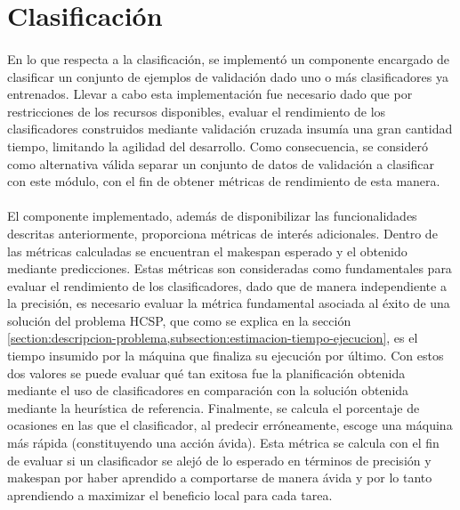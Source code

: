 \section{Clasificación} \label{chapter-implementacion:clasificacion}

\paragraph{} En lo que respecta a la clasificación, se implementó un componente encargado de clasificar un conjunto de ejemplos de validación dado uno o más clasificadores ya entrenados.
Llevar a cabo esta implementación fue necesario dado que por restricciones de los recursos disponibles, evaluar el rendimiento de los clasificadores construidos mediante validación cruzada insumía una gran cantidad tiempo, limitando la agilidad del desarrollo.
Como consecuencia, se consideró como alternativa válida separar un conjunto de datos de validación a clasificar con este módulo, con el fin de obtener métricas de rendimiento de esta manera. 

\paragraph{} El componente implementado, además de disponibilizar las funcionalidades descritas anteriormente, proporciona métricas de interés adicionales.
Dentro de las métricas calculadas se encuentran el makespan esperado y el obtenido mediante predicciones.
Estas métricas son consideradas como fundamentales para evaluar el rendimiento de los clasificadores, dado que de manera independiente a la precisión, es necesario evaluar la métrica fundamental asociada al éxito de una solución del problema HCSP, que como se explica en la sección \ref{section:descripcion-problema,subsection:estimacion-tiempo-ejecucion}, es el tiempo insumido por la máquina que finaliza su ejecución por último.
Con estos dos valores se puede evaluar qué tan exitosa fue la planificación obtenida mediante el uso de clasificadores en comparación con la solución obtenida mediante la heurística de referencia.
Finalmente, se calcula el porcentaje de ocasiones en las que el clasificador, al predecir erróneamente, escoge una máquina más rápida (constituyendo una acción ávida).
Esta métrica se calcula con el fin de evaluar si un clasificador se alejó de lo esperado en términos de precisión y makespan por haber aprendido a comportarse de manera ávida y por lo tanto aprendiendo a maximizar el beneficio local para cada tarea.

